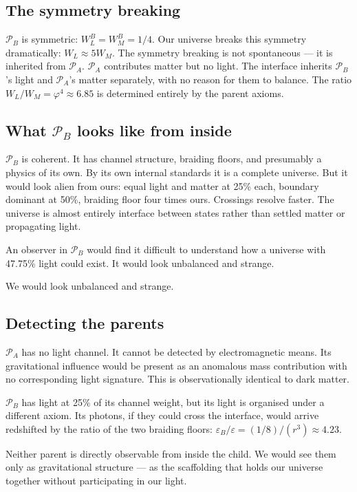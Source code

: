 \documentclass[prd,twocolumn,preprintnumbers,amsmath,amssymb]{revtex4-2}
\newcommand{\parentA}{\mathcal{P}_A}
\newcommand{\parentB}{\mathcal{P}_B}
\begin{document}
\subsection{The symmetry breaking}

$\parentB$ is symmetric: $W_L^B = W_M^B = 1/4$. Our universe breaks
this symmetry dramatically: $W_L \approx 5 W_M$. The symmetry
breaking is not spontaneous --- it is inherited from $\parentA$.
$\parentA$ contributes matter but no light. The interface inherits
$\parentB$'s light and $\parentA$'s matter separately, with no
reason for them to balance. The ratio $W_L/W_M = \varphi^4 \approx
6.85$ is determined entirely by the parent axioms.

\subsection{What $\parentB$ looks like from inside}

$\parentB$ is coherent. It has channel structure, braiding floors,
and presumably a physics of its own. By its own internal standards
it is a complete universe. But it would look alien from ours:
equal light and matter at 25\% each, boundary dominant at 50\%,
braiding floor four times ours. Crossings resolve faster. The
universe is almost entirely interface between states rather than
settled matter or propagating light.

An observer in $\parentB$ would find it difficult to understand
how a universe with 47.75\% light could exist. It would look
unbalanced and strange.

We would look unbalanced and strange.

\subsection{Detecting the parents}

$\parentA$ has no light channel. It cannot be detected by
electromagnetic means. Its gravitational influence would be present
as an anomalous mass contribution with no corresponding light
signature. This is observationally identical to dark matter.

$\parentB$ has light at 25\% of its channel weight, but its light
is organised under a different axiom. Its photons, if they could
cross the interface, would arrive redshifted by the ratio of the
two braiding floors: $\varepsilon_B/\varepsilon = (1/8)/(r^3) \approx 4.23$.

Neither parent is directly observable from inside the child. We
would see them only as gravitational structure — as the scaffolding
that holds our universe together without participating in our light.
\end{document}
